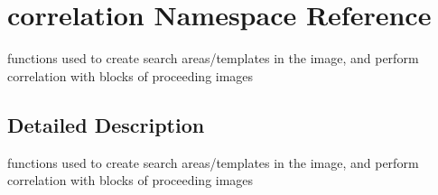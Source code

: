\hypertarget{namespacecorrelation}{
\section{correlation Namespace Reference}
\label{namespacecorrelation}
}


functions used to create search areas/templates in the image, and perform correlation with blocks of proceeding images  




\subsection{Detailed Description}
functions used to create search areas/templates in the image, and perform correlation with blocks of proceeding images 